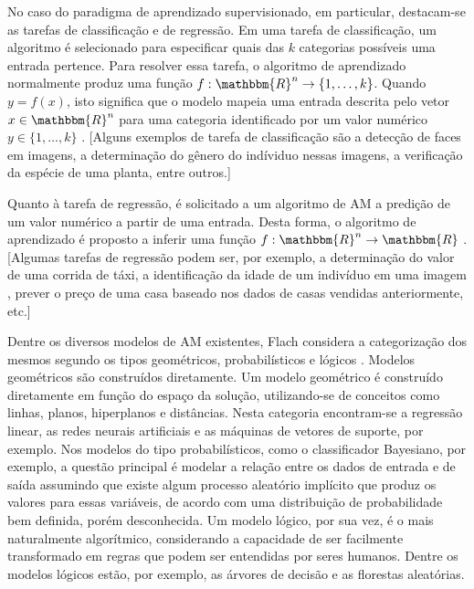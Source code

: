 No caso do paradigma de aprendizado supervisionado, em particular, destacam-se as tarefas de classificação e de regressão. Em uma tarefa de classificação, um algoritmo é selecionado para especificar quais das $k$ categorias possíveis uma entrada pertence. Para resolver essa tarefa, o algoritmo de aprendizado normalmente produz uma função $f : \mathbbm{R}^n \rightarrow \{1, \ldots, k\}$. Quando $y = f(x)$, isto significa que o modelo mapeia uma entrada descrita pelo vetor $x \in \mathbbm{R}^n$ para uma categoria identificado por um valor numérico $y \in \{1, \ldots, k\} $ \cite{goodfellow}. [Alguns exemplos de tarefa de classificação são a detecção de faces em imagens, a determinação do gênero do indíviduo nessas imagens, a verificação da espécie de uma planta, entre outros.] 

Quanto à tarefa de regressão, é solicitado a um algoritmo de AM a predição de um valor numérico a partir de uma entrada. Desta forma, o algoritmo de aprendizado é proposto a inferir uma função $f : \mathbbm{R}^n \rightarrow \mathbbm{R}$ \cite{goodfellow}. [Algumas tarefas de regressão podem ser, por exemplo, a determinação do valor de uma corrida de táxi, a identificação da idade de um indivíduo em uma imagem , prever o preço de uma casa baseado nos dados de casas vendidas anteriormente, etc.] 

Dentre os diversos modelos de AM existentes, Flach considera a categorização dos mesmos segundo os tipos geométricos, probabilísticos e lógicos \cite{flach}. Modelos geométricos são construídos diretamente. Um modelo geométrico é construído diretamente em função do espaço da solução, utilizando-se de conceitos como linhas, planos, hiperplanos e distâncias. Nesta categoria encontram-se a regressão linear, as redes neurais artificiais e as máquinas de vetores de suporte, por exemplo. Nos modelos do tipo probabilísticos, como o classificador Bayesiano, por exemplo, a questão principal é modelar a relação entre os dados de entrada e de saída assumindo que existe algum processo aleatório implícito que produz os valores para essas variáveis, de acordo com uma distribuição de probabilidade bem definida, porém desconhecida. Um modelo lógico, por sua vez, é o mais naturalmente algorítmico, considerando a capacidade de ser facilmente transformado em regras que podem ser entendidas por seres humanos. Dentre os modelos lógicos estão, por exemplo, as árvores de decisão e as florestas aleatórias.



